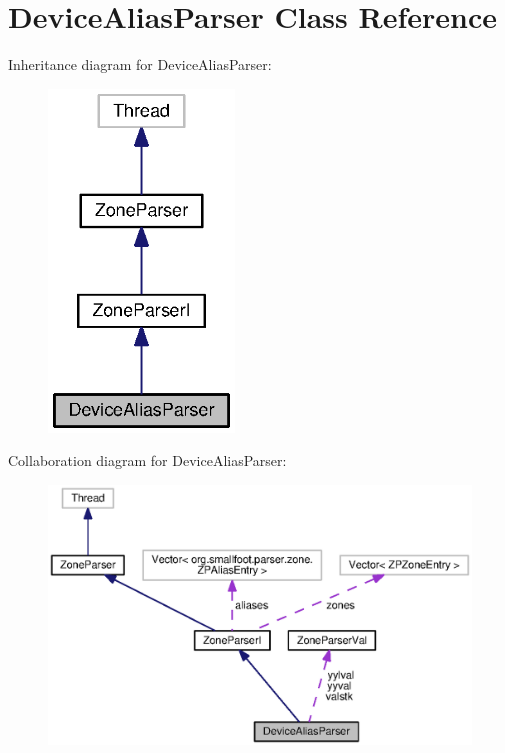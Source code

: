 \section{Device\-Alias\-Parser Class Reference}
\label{classorg_1_1smallfoot_1_1parser_1_1zone_1_1DeviceAliasParser}


Inheritance diagram for Device\-Alias\-Parser\-:\nopagebreak
\begin{figure}[H]
\begin{center}
\leavevmode
\includegraphics[width=140pt]{classorg_1_1smallfoot_1_1parser_1_1zone_1_1DeviceAliasParser__inherit__graph}
\end{center}
\end{figure}


Collaboration diagram for Device\-Alias\-Parser\-:\nopagebreak
\begin{figure}[H]
\begin{center}
\leavevmode
\includegraphics[width=350pt]{classorg_1_1smallfoot_1_1parser_1_1zone_1_1DeviceAliasParser__coll__graph}
\end{center}
\end{figure}
